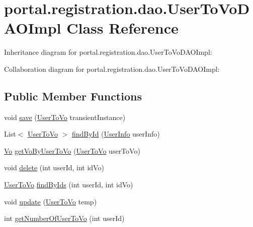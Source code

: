 \hypertarget{classportal_1_1registration_1_1dao_1_1UserToVoDAOImpl}{
\section{portal.registration.dao.UserToVoDAOImpl Class Reference}
\label{classportal_1_1registration_1_1dao_1_1UserToVoDAOImpl}
}


Inheritance diagram for portal.registration.dao.UserToVoDAOImpl:


Collaboration diagram for portal.registration.dao.UserToVoDAOImpl:
\subsection*{Public Member Functions}
\begin{DoxyCompactItemize}
\item 
void \hyperlink{classportal_1_1registration_1_1dao_1_1UserToVoDAOImpl_a789b9e9bb0eb777498afe53ede2902ed}{save} (\hyperlink{classportal_1_1registration_1_1domain_1_1UserToVo}{UserToVo} transientInstance)
\item 
List$<$ \hyperlink{classportal_1_1registration_1_1domain_1_1UserToVo}{UserToVo} $>$ \hyperlink{classportal_1_1registration_1_1dao_1_1UserToVoDAOImpl_a674ef52989e20d842a88267fba68cf2a}{findById} (\hyperlink{classportal_1_1registration_1_1domain_1_1UserInfo}{UserInfo} userInfo)
\item 
\hyperlink{classportal_1_1registration_1_1domain_1_1Vo}{Vo} \hyperlink{classportal_1_1registration_1_1dao_1_1UserToVoDAOImpl_ace46933eb9117d6aee1739da9dd90a34}{getVoByUserToVo} (\hyperlink{classportal_1_1registration_1_1domain_1_1UserToVo}{UserToVo} userToVo)
\item 
void \hyperlink{classportal_1_1registration_1_1dao_1_1UserToVoDAOImpl_ad46f970a0ba6e789452871285e91e8aa}{delete} (int userId, int idVo)
\item 
\hyperlink{classportal_1_1registration_1_1domain_1_1UserToVo}{UserToVo} \hyperlink{classportal_1_1registration_1_1dao_1_1UserToVoDAOImpl_ad672a9e02279a24f322b9041a28f1660}{findByIds} (int userId, int idVo)
\item 
void \hyperlink{classportal_1_1registration_1_1dao_1_1UserToVoDAOImpl_a99367cb6fd9ecb12d6cd1da21d216a1c}{update} (\hyperlink{classportal_1_1registration_1_1domain_1_1UserToVo}{UserToVo} temp)
\item 
int \hyperlink{classportal_1_1registration_1_1dao_1_1UserToVoDAOImpl_a322e6675f44c7c89bfee68b41ec74ea2}{getNumberOfUserToVo} (int userId)
\end{DoxyCompactItemize}
